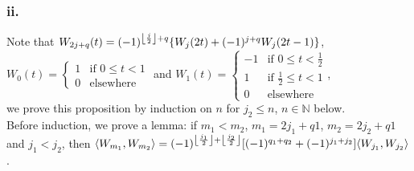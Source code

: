 \documentclass[12pt]{article}
\DeclarePairedDelimiter\floor{\lfloor}{\rfloor}
\begin{document}
    \subsubsection*{ii.}
    Note that $W_{2j+q}(t) = (-1)^{\floor*{\frac{j}{2}}+q} \{W_j(2t)+(-1)^{j+q}W_j(2t-1)\}$,\\
    $W_0(t) = \begin{cases}
        1 & \text{if $0 \leq t < 1$}\\
        0 & \text{elsewhere}
    \end{cases}$ and $W_1(t) = \begin{cases}
        -1 & \text{if $0 \leq t < \frac{1}{2}$}\\
        1 & \text{if $\frac{1}{2} \leq t < 1$}\\
        0 & \text{elsewhere}
    \end{cases}$,\\ we prove this proposition by induction on $n$ for $j_2 \leq n$, $n \in \mathbb{N}$ below.\\
    Before induction, we prove a lemma: if $m_1 < m_2$, $m_1 = 2j_1+q1$, $m_2 = 2j_2+q1$ and $j_1 < j_2$, then 
    $\langle W_{m_1}, W_{m_2} \rangle = (-1)^{\floor*{\frac{j_1}{2}}+\floor*{\frac{j_2}{2}}}[(-1)^{q_1+q_2}+(-1)^{j_1+j_2}] \langle W_{j_1}, W_{j_2} \rangle$.
\end{document}
